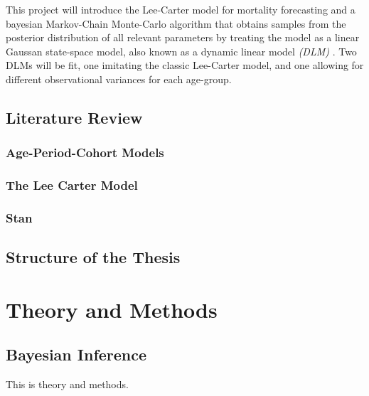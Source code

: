 \documentclass[
]{book}
\begin{document}
This project will introduce the Lee-Carter model \citep{lee1992modeling} for mortality forecasting and a bayesian Markov-Chain Monte-Carlo algorithm that obtains samples from the posterior distribution of all relevant parameters by treating the model as a linear Gaussan state-space model, also known as a dynamic linear model \emph{(DLM)} \citep{west2006bayesian}. Two DLMs will be fit, one imitating the classic Lee-Carter model, and one allowing for different observational variances for each age-group.

\hypertarget{literature-review}{%
\section{Literature Review}\label{literature-review}}

\hypertarget{age-period-cohort-models}{%
\subsection{Age-Period-Cohort Models}\label{age-period-cohort-models}}

\hypertarget{the-lee-carter-model}{%
\subsection{The Lee Carter Model}\label{the-lee-carter-model}}

\hypertarget{stan}{%
\subsection{Stan}\label{stan}}

\hypertarget{structure-of-the-thesis}{%
\section{Structure of the Thesis}\label{structure-of-the-thesis}}

\hypertarget{theory-and-methods}{%
\chapter{Theory and Methods}\label{theory-and-methods}}

\hypertarget{bayesian-inference}{%
\section{Bayesian Inference}\label{bayesian-inference}}

This is theory and methods.
\end{document}
